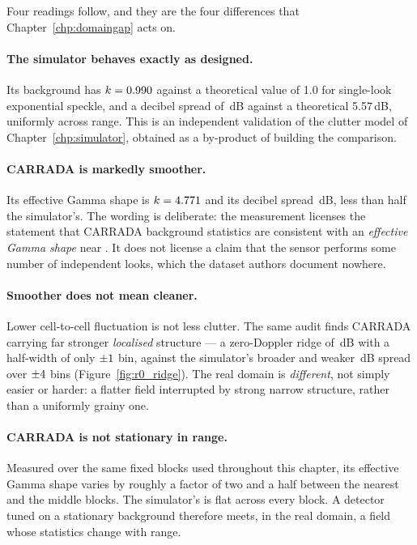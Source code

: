 Four readings follow, and they are the four differences that Chapter~\ref{chp:domaingap} acts on.

\paragraph{The simulator behaves exactly as designed.} Its background has $k = 0.990{}$
against a theoretical value of 1.0 for single-look exponential speckle, and a decibel spread of
\RzeroSimDBstd{}\,dB against a theoretical 5.57\,dB, uniformly across range. This is an independent
validation of the clutter model of Chapter~\ref{chp:simulator}, obtained as a by-product of building
the comparison.

\paragraph{CARRADA is markedly smoother.} Its effective Gamma shape is $k = 4.771{}$
and its decibel spread \RzeroCarradaDBstd{}\,dB, less than half the simulator's. The wording is
deliberate: the measurement licenses the statement that CARRADA background statistics are consistent
with an \emph{effective Gamma shape} near \RzeroCarradaGammaK{}. It does not license a claim that the
sensor performs some number of independent looks, which the dataset authors document nowhere.

\paragraph{Smoother does not mean cleaner.} Lower cell-to-cell fluctuation is not less clutter. The
same audit finds CARRADA carrying far stronger \emph{localised} structure --- a zero-Doppler ridge of
\RzeroCarradaRidge{}\,dB with a half-width of only $\pm1{}$ bin, against the
simulator's broader and weaker \RzeroSimRidge{}\,dB spread over $\pm4{}$ bins
(Figure~\ref{fig:r0_ridge}). The real domain is \emph{different}, not simply easier or harder: a
flatter field interrupted by strong narrow structure, rather than a uniformly grainy one.

\paragraph{CARRADA is not stationary in range.} Measured over the same fixed blocks used throughout
this chapter, its effective Gamma shape varies by roughly a factor of two and a half between the
nearest and the middle blocks. The simulator's is flat across every block. A detector tuned on a
stationary background therefore meets, in the real domain, a field whose statistics change with
range.

